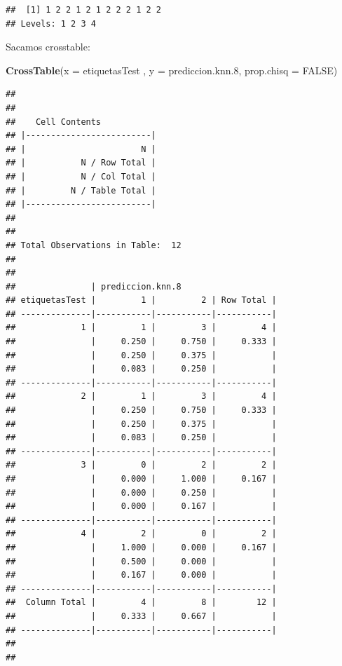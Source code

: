 \documentclass[]{article}
\newenvironment{Shaded}{\begin{snugshade}}{\end{snugshade}}
\newcommand{\KeywordTok}[1]{\textcolor[rgb]{0.13,0.29,0.53}{\textbf{#1}}}
\newcommand{\DataTypeTok}[1]{\textcolor[rgb]{0.13,0.29,0.53}{#1}}
\newcommand{\DecValTok}[1]{\textcolor[rgb]{0.00,0.00,0.81}{#1}}
\newcommand{\OtherTok}[1]{\textcolor[rgb]{0.56,0.35,0.01}{#1}}
\newcommand{\NormalTok}[1]{#1}
\begin{document}
\begin{verbatim}
##  [1] 1 2 2 1 2 1 2 2 2 1 2 2
## Levels: 1 2 3 4
\end{verbatim}

Sacamos crosstable:

\begin{Shaded}
\begin{Highlighting}[]
\KeywordTok{CrossTable}\NormalTok{(}\DataTypeTok{x =}\NormalTok{ etiquetasTest , }\DataTypeTok{y =}\NormalTok{ prediccion.knn.}\DecValTok{8}\NormalTok{, }\DataTypeTok{prop.chisq =} \OtherTok{FALSE}\NormalTok{)}
\end{Highlighting}
\end{Shaded}

\begin{verbatim}
## 
##  
##    Cell Contents
## |-------------------------|
## |                       N |
## |           N / Row Total |
## |           N / Col Total |
## |         N / Table Total |
## |-------------------------|
## 
##  
## Total Observations in Table:  12 
## 
##  
##               | prediccion.knn.8 
## etiquetasTest |         1 |         2 | Row Total | 
## --------------|-----------|-----------|-----------|
##             1 |         1 |         3 |         4 | 
##               |     0.250 |     0.750 |     0.333 | 
##               |     0.250 |     0.375 |           | 
##               |     0.083 |     0.250 |           | 
## --------------|-----------|-----------|-----------|
##             2 |         1 |         3 |         4 | 
##               |     0.250 |     0.750 |     0.333 | 
##               |     0.250 |     0.375 |           | 
##               |     0.083 |     0.250 |           | 
## --------------|-----------|-----------|-----------|
##             3 |         0 |         2 |         2 | 
##               |     0.000 |     1.000 |     0.167 | 
##               |     0.000 |     0.250 |           | 
##               |     0.000 |     0.167 |           | 
## --------------|-----------|-----------|-----------|
##             4 |         2 |         0 |         2 | 
##               |     1.000 |     0.000 |     0.167 | 
##               |     0.500 |     0.000 |           | 
##               |     0.167 |     0.000 |           | 
## --------------|-----------|-----------|-----------|
##  Column Total |         4 |         8 |        12 | 
##               |     0.333 |     0.667 |           | 
## --------------|-----------|-----------|-----------|
## 
## 
\end{verbatim}
\end{document}

